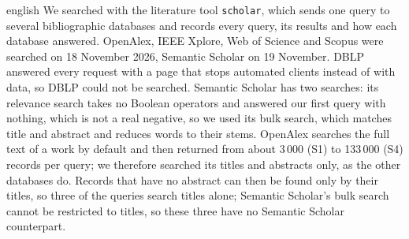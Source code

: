 \begin{onlyin}{english} %
We searched with the literature tool \texttt{scholar}, which sends one
query to several bibliographic databases and records every query, its
results and how each database answered.  OpenAlex, IEEE Xplore, Web of
Science and Scopus were searched on 18 November 2026, Semantic Scholar on
19 November.  DBLP answered every request with a page that stops
automated clients instead of with data, so DBLP could not be searched.
Semantic Scholar has two searches: its relevance search takes no Boolean
operators and answered our first query with nothing, which is not a real
negative, so we used its bulk search, which matches title and abstract
and reduces words to their stems.  OpenAlex searches the full text of a
work by default and then returned from about 3\,000 (S1) to 133\,000 (S4)
records per query; we therefore searched its titles and abstracts only,
as the other databases do.  Records that have no abstract can then be
found only by their titles, so three of the queries search titles alone;
Semantic Scholar's bulk search cannot be restricted to titles, so these
three have no Semantic Scholar counterpart.


\end{onlyin}
